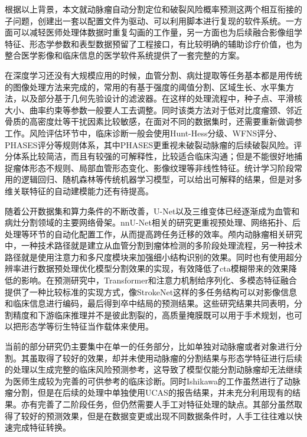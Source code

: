 根据以上背景，本文就动脉瘤自动分割定位和破裂风险概率预测这两个相互衔接的子问题，创建出一套以配置文件为驱动、可以利用脚本进行复现的软件系统。一方面可以减轻医师处理体数据时重复勾画的工作量，另一方面也为后续融合影像组学特征、形态学参数和表型数据预留了工程接口，有比较明确的辅助诊疗价值，也为整合医学影像和临床信息的医学软件系统提供了一套完整的方案。



在深度学习还没有大规模应用的时候，血管分割、病灶提取等任务基本都是用传统的图像处理方法来完成的，常用的有基于强度的阈值分割、区域生长、水平集方法，以及部分基于几何先验设计的滤波器。在这样的处理流程中，种子点、平滑核大小、曲率约束等参数一般要人工去调整。同时该类方法对于低对比度瘤颈、邻近骨质的高密度灶等干扰因素比较敏感，在面对不同的数据集时，还需要重新做调参工作。风险评估环节中，临床诊断一般会使用Hunt-Hess分级、WFNS评分、PHASES评分等规则体系，其中PHASES更重视未破裂动脉瘤的后续破裂风险\cite{greving2014}。评分体系比较简洁，而且有较强的可解释性，比较适合临床沟通；但是不能很好地捕捉瘤体形态不规则、局部血管形态变化、影像纹理等非线性特征。统计学习阶段常用的逻辑回归、随机森林等传统机器学习模型，可以给出可解释的结果，但是对多维关联特征的自动建模能力还有待提高。


随着公开数据集和算力条件的不断改善，U-Net以及三维变体已经逐渐成为血管和病灶分割领域的主要网络骨架\cite{unet,unet3d}。nnU-Net相关的研究更重视预处理、网络拓扑、后处理等环节的自动化配置工作，从而提高跨任务迁移的效率\cite{nnunet}。颅内动脉瘤相关研究中，一种技术路径就是建立从血管分割到瘤体检测的多阶段处理流程，另一种技术路径就是使用注意力和多尺度模块来加强细小结构识别的效果\cite{li2018coarse,chen2022coarse}。同时也有使用超分辨率进行数据预处理优化模型分割效果的实现\cite{He2026Increased}，有效降低了cta模糊带来的效果降低的影响。在预测研究中，Transformer和注意力机制给序列化、多模态特征融合提供了一种比较标准的实现方式\cite{vaswani2017}，像StrokeNet这样的多任务结构可以对影像信息和临床信息进行编码，最后得到卒中结局的预测结果\cite{strokenet}。这些研究结果共同表明，分割精度和下游临床推理并不是彼此割裂的，高质量掩膜既可以用于手术规划，也可以把形态学等衍生特征当作载体来使用。


当前的部分研究仍主要集中在单一的任务部分，比如单独对动脉瘤或者对象进行分割\cite{long2015,milletari2016,nnunet,Zeng2026AI,indrakanti2025multicentric,wang2025dualpath}。其虽取得了较好的效果，却并未使用动脉瘤的分割结果与形态学特征进行后续的处理以生成完整的临床风险预测参考，这导致了模型仅能分割动脉瘤却无法继续为医师生成较为完善的可供参考的临床诊断。同时Ishikawa\cite{Ishikawa2026Detection}的工作虽然进行了动脉瘤分割，但是在后续的处理中单独使用UCAS的报告结果，并未充分利用现有的结果。亦有完善了二阶段任务，但仍然需要人手工对特征处理\cite{Ali2026ijasis}的缺点。其部分虽然取得了较好的预测效果，但是在数据变更或出现不同数据条件时，人手工往往难以快速完成特征转换。

